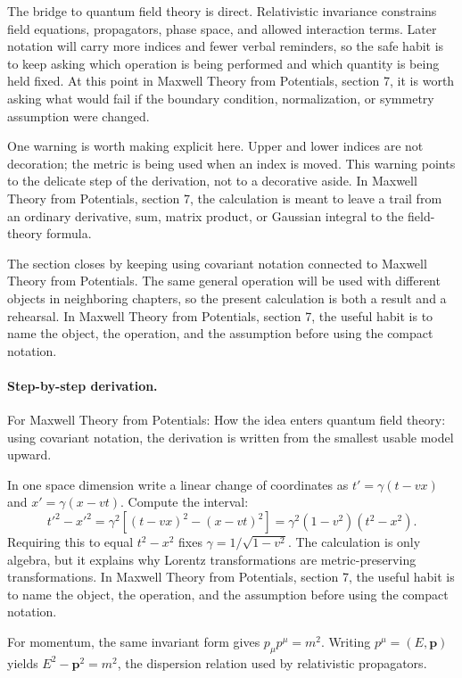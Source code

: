 The bridge to quantum field theory is direct.  Relativistic invariance constrains field equations, propagators, phase space, and allowed interaction terms.  Later notation will carry more indices and fewer verbal reminders, so the safe habit is to keep asking which operation is being performed and which quantity is being held fixed.  At this point in Maxwell Theory from Potentials, section 7, it is worth asking what would fail if the boundary condition, normalization, or symmetry assumption were changed.

One warning is worth making explicit here.  Upper and lower indices are not decoration; the metric is being used when an index is moved.  This warning points to the delicate step of the derivation, not to a decorative aside.  In Maxwell Theory from Potentials, section 7, the calculation is meant to leave a trail from an ordinary derivative, sum, matrix product, or Gaussian integral to the field-theory formula.

The section closes by keeping using covariant notation connected to Maxwell Theory from Potentials.  The same general operation will be used with different objects in neighboring chapters, so the present calculation is both a result and a rehearsal.  In Maxwell Theory from Potentials, section 7, the useful habit is to name the object, the operation, and the assumption before using the compact notation.



\paragraph{Step-by-step derivation.}

For Maxwell Theory from Potentials: How the idea enters quantum field theory: using covariant notation, the derivation is written from the smallest usable model upward.

In one space dimension write a linear change of coordinates as \(t'=\gamma(t-vx)\) and \(x'=\gamma(x-vt)\).  Compute the interval:
\[
  t'^2-x'^2
  =
  \gamma^2[(t-vx)^2-(x-vt)^2]
  =
  \gamma^2(1-v^2)(t^2-x^2).
\]
Requiring this to equal \(t^2-x^2\) fixes \(\gamma=1/\sqrt{1-v^2}\).  The calculation is only algebra, but it explains why Lorentz transformations are metric-preserving transformations.  In Maxwell Theory from Potentials, section 7, the useful habit is to name the object, the operation, and the assumption before using the compact notation.

For momentum, the same invariant form gives \(p_\mu p^\mu=m^2\).  Writing \(p^\mu=(E,\bm p)\) yields \(E^2-\bm p^2=m^2\), the dispersion relation used by relativistic propagators.

